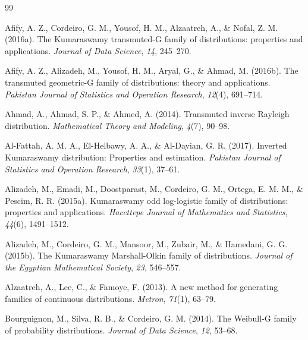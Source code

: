 \documentclass[12pt]{article}
\begin{document}
\begin{thebibliography}{99}



Afify, A. Z., Cordeiro, G. M., Yousof, H. M., Alzaatreh, A., \& Nofal, Z. M. (2016a).
The Kumaraswamy transmuted-G family of distributions: properties and applications.
\emph{Journal of Data Science}, \emph{14}, 245--270.



Afify, A. Z., Alizadeh, M., Yousof, H. M., Aryal, G., \& Ahmad, M. (2016b).
The transmuted geometric-G family of distributions: theory and applications.
\emph{Pakistan Journal of Statistics and Operation Research}, \emph{12}(4), 691--714.



Ahmad, A., Ahmad, S. P., \& Ahmed, A. (2014).
Transmuted inverse Rayleigh distribution.
\emph{Mathematical Theory and Modeling}, \emph{4}(7), 90--98.



Al-Fattah, A. M. A., El-Helbawy, A. A., \& Al-Dayian, G. R. (2017).
Inverted Kumaraswamy distribution: Properties and estimation.
\emph{Pakistan Journal of Statistics and Operation Research}, \emph{33}(1), 37--61.



Alizadeh, M., Emadi, M., Doostparast, M., Cordeiro, G. M., Ortega, E. M. M., \& Pescim, R. R. (2015a).
Kumaraswamy odd log-logistic family of distributions: properties and applications.
\emph{Hacettepe Journal of Mathematics and Statistics}, \emph{44}(6), 1491--1512.



Alizadeh, M., Cordeiro, G. M., Mansoor, M., Zubair, M., \& Hamedani, G. G. (2015b).
The Kumaraswamy Marshall-Olkin family of distributions.
\emph{Journal of the Egyptian Mathematical Society}, \emph{23}, 546--557.



Alzaatreh, A., Lee, C., \& Famoye, F. (2013).
A new method for generating families of continuous distributions.
\emph{Metron}, \emph{71}(1), 63--79.



Bourguignon, M., Silva, R. B., \& Cordeiro, G. M. (2014).
The Weibull-G family of probability distributions.
\emph{Journal of Data Science}, \emph{12}, 53--68.




\end{thebibliography}
\end{document}
